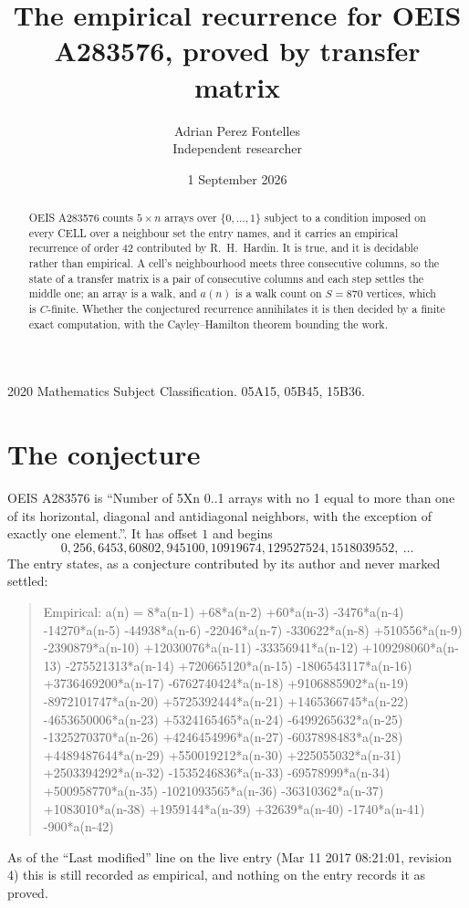 \documentclass[11pt,a4paper]{article}
\title{The empirical recurrence for OEIS A283576, proved by transfer matrix}
\author{Adrian Perez Fontelles\\ \small Independent researcher}
\date{1 September 2026}
\theoremstyle{plain}
\theoremstyle{definition}
\begin{document}
\maketitle

\begin{abstract}
OEIS A283576 counts $5\times n$ arrays over $\{0,\dots,1\}$ subject to a condition imposed on
every CELL over a neighbour set the entry names, and it carries an empirical recurrence of
order $42$ contributed by R.~H.~Hardin. It is true, and it is decidable rather than
empirical. A cell's neighbourhood meets three consecutive columns, so the state of a transfer
matrix is a pair of consecutive columns and each step settles the middle one; an array is a
walk, and $a(n)$ is a walk count on $S=870$ vertices, which is $C$-finite. Whether the
conjectured recurrence annihilates it is then decided by a finite exact computation, with the
Cayley--Hamilton theorem bounding the work.
\end{abstract}

\noindent\small 2020 Mathematics Subject Classification. 05A15, 05B45, 15B36.\normalsize

\section{The conjecture}

OEIS A283576 is ``Number of 5Xn 0..1 arrays with no 1 equal to more than one of its horizontal, diagonal and antidiagonal neighbors, with the exception of exactly one element.''. It has offset $1$ and begins
\[
0, 256, 6453, 60802, 945100, 10919674, 129527524, 1518039552,\ \dots
\]
The entry states, as a conjecture contributed by its author and never marked settled:
\begin{quote}
Empirical: a(n) = 8*a(n-1) +68*a(n-2) +60*a(n-3) -3476*a(n-4) -14270*a(n-5) -44938*a(n-6) -22046*a(n-7) -330622*a(n-8) +510556*a(n-9) -2390879*a(n-10) +12030076*a(n-11) -33356941*a(n-12) +109298060*a(n-13) -275521313*a(n-14) +720665120*a(n-15) -1806543117*a(n-16) +3736469200*a(n-17) -6762740424*a(n-18) +9106885902*a(n-19) -8972101747*a(n-20) +5725392444*a(n-21) +1465366745*a(n-22) -4653650006*a(n-23) +5324165465*a(n-24) -6499265632*a(n-25) -1325270370*a(n-26) +4246454996*a(n-27) -6037898483*a(n-28) +4489487644*a(n-29) +550019212*a(n-30) +225055032*a(n-31) +2503394292*a(n-32) -1535246836*a(n-33) -69578999*a(n-34) +500958770*a(n-35) -1021093565*a(n-36) -36310362*a(n-37) +1083010*a(n-38) +1959144*a(n-39) +32639*a(n-40) -1740*a(n-41) -900*a(n-42)
\end{quote}
As of the ``Last modified'' line on the live entry (Mar 11 2017 08:21:01, revision 4) this is still
recorded as empirical, and nothing on the entry records it as proved.
\end{document}
